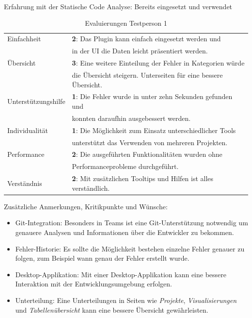 Erfahrung mit der Statische Code Analyse: Bereits eingesetzt und verwendet
\begin{center}
\begin{table}[h]
\begin{tabular}{ l | l }
Einfachheit         & \textbf{2}: Das Plugin kann einfach eingesetzt werden und \\ & in der UI die Daten leicht präsentiert werden.\\
Übersicht           & \textbf{3}: Eine weitere Einteilung der Fehler in Kategorien würde \\ & die Übersicht steigern. Unterseiten für eine bessere Übersicht.\\
Unterstützungshilfe & \textbf{1}: Die Fehler wurde in unter zehn Sekunden gefunden und \\ & konnten daraufhin ausgebessert werden. \\
Individualität         & \textbf{1}: Die Möglichkeit zum Einsatz unterschiedlicher  Tools \\ & unterstützt das Verwenden von mehreren Projekten.\\
Performance           & \textbf{2}: Die ausgeführten Funktionalitäten wurden ohne \\ & Performanceprobleme durchgeführt. \\
Verständnis & \textbf{2}: Mit zusätzlichen Tooltips und Hilfen ist alles verständlich. \\
\end{tabular}
\caption{Evaluierungen Testperson 1} \label{tab:grey}
\end{table}
\end{center}

Zusätzliche Anmerkungen, Kritikpunkte und Wünsche:
\begin{itemize}
\item{Git-Integration}: Besonders in Teams ist eine Git-Unterstützung notwendig um genauere Analysen und Informationen über die Entwickler zu bekommen. 
\item{Fehler-Historie}: Es sollte die Möglichkeit bestehen einzelne Fehler genauer zu folgen, zum Beispiel wann genau der Fehler erstellt wurde.
\item{Desktop-Applikation}: Mit einer Desktop-Applikation kann eine bessere Interaktion mit der Entwicklungsumgebung erfolgen.
\item{Unterteilung}: Eine Unterteilungen in Seiten wie \textit{Projekte}, \textit{Visualisierungen} und \textit{Tabellenübersicht} kann eine bessere Übersicht gewährleisten.
\end{itemize}
